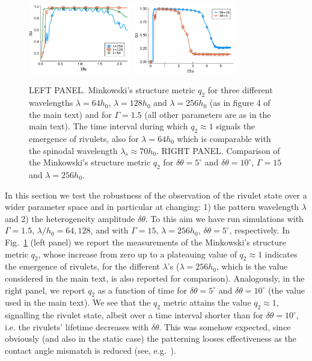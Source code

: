 \documentclass[amsmath,amssymb,showpacs,prf,superscriptaddress,notitlepage,longbibliography]{revtex4-1}
\begin{document}
\begin{figure}
    \centering
    \includegraphics[width=0.4\textwidth]{SupMatFig_1.pdf}
    \includegraphics[width=0.4\textwidth]{SupMatFig_2.pdf}
    \caption{LEFT PANEL. Minkowski's structure metric $q_2$ for three different wavelengths $\lambda=64 h_0$, $\lambda=128 h_0$ and 
    $\lambda=256 h_0$ (as in figure 4 of the main text) and for $\Gamma=1.5$ (all other parameters are as in the main text). 
    The time interval during which $q_2 \approx 1$ signals the emergence of rivulets, also for $\lambda = 64 h_0$ which is comparable with the spinodal wavelength $\lambda_s \approx 70 h_0$. RIGHT PANEL. Comparison of the Minkowski's structure metric $q_2$ for $\delta\theta=5^{\circ}$ and $\delta\theta=10^{\circ}$, 
    $\Gamma = 15$ and $\lambda = 256 h_0$.}
    \label{fig:q2_difflambda}
\end{figure}
\noindent In this section we test the robustness of the observation of the rivulet state over a wider parameter space and in particular at changing: 1) the pattern wavelength $\lambda$ and 2) the heterogeneity amplitude $\delta \theta$.
To this aim we have run simulations with $\Gamma=1.5$, $\lambda/h_0 = 64, 128$, and with $\Gamma = 15$, $\lambda = 256 h_0$, $\delta \theta = 5^{\circ}$, respectively.
In Fig.~\ref{fig:q2_difflambda} (left panel) we report the measurements of the Minkowski's structure metric $q_2$, whose increase from zero up to a plateauing value of $q_2 \approx 1$ indicates the emergence of rivulets, for the different $\lambda$'s ($\lambda=256 h_0$, which is the value considered in the main text, is also reported for comparison).
Analogously, in the right panel, we report $q_2$ as a function of time for $\delta \theta = 5^{\circ}$  and $\delta \theta = 10^{\circ}$ (the value used in the main text). 
We see that the $q_2$ metric attains the value $q_2 \approx 1$, signalling the rivulet state, albeit over a time interval shorter than for $\delta \theta = 10^{\circ}$, i.e. the rivulets' lifetime decreases with $\delta \theta$. 
This was somehow expected, since obviously (and also in the static case) the patterning looses effectiveness as the contact angle mismatch is reduced (see, e.g.~\cite{konnurInstabilityMorphologyThin2000}).
\end{document}

